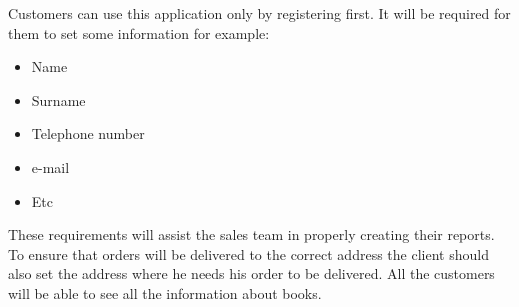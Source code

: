  Customers can use this application only by registering first. It will be required for them to set some information for example:
 \begin{itemize}
\item Name
\item Surname
\item Telephone number
\item e-mail
\item Etc
 \end{itemize}
These requirements will assist the sales team in properly creating their reports. To ensure that orders will be delivered to the correct address the client should also set the address where he needs his order to be delivered. All the customers will be able to see all the information about books. 